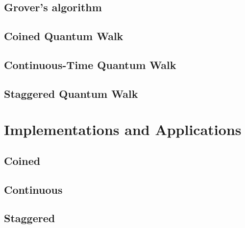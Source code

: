 \documentclass[
oneside,
11pt, a4paper,
footinclude=true,
headinclude=true,
cleardoublepage=empty
]{scrbook}
\begin{document}
\section{Grover's algorithm}

\section{Coined Quantum Walk}

\section{Continuous-Time Quantum Walk}

\section{Staggered Quantum Walk}


\chapter{Implementations and Applications}\label{chap:qiskitImplementation}
\section{Coined}\label{coinedQWQiskit}

\section{Continuous}

\section{Staggered}
\end{document}
